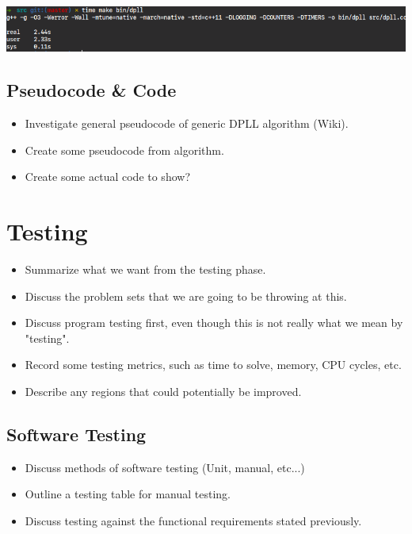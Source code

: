 \documentclass{article}
\begin{document}
\begin{center}
    \includegraphics[scale=0.4]{time_command_example.png}
\end{center}

\subsection{Pseudocode \& Code}
\begin{itemize}
    \item Investigate general pseudocode of generic DPLL algorithm (Wiki).
    \item Create some pseudocode from algorithm.
    \item Create some actual code to show?
\end{itemize}

\section{Testing}
\begin{itemize}
    \item Summarize what we want from the testing phase.
    \item Discuss the problem sets that we are going to be throwing at this.
    \item Discuss program testing first, even though this is not really what we mean by "testing".
    \item Record some testing metrics, such as time to solve, memory, CPU cycles, etc.
    \item Describe any regions that could potentially be improved.
\end{itemize}

\subsection{Software Testing}
\begin{itemize}
    \item Discuss methods of software testing (Unit, manual, etc...)
    \item Outline a testing table for manual testing.
    \item Discuss testing against the functional requirements stated previously.
\end{itemize}
\end{document}

